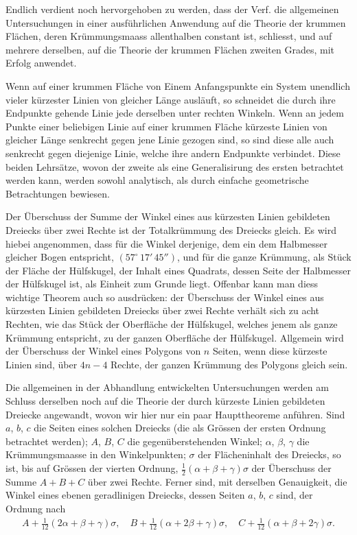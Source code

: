 \documentclass[fontsize=10pt,paper=a5,pagesize,headings=small,headinclude=true,footinclude=true]{scrbook}
\begin{document}
Endlich verdient noch hervorgehoben zu werden, dass der Verf. die allgemeinen Untersuchungen in einer ausführlichen Anwendung auf die Theorie der krummen Flächen, deren Krümmungsmaass allenthalben constant ist, schliesst, und auf mehrere derselben, auf die Theorie der krummen Flächen zweiten Grades, mit Erfolg anwendet.

Wenn auf einer krummen Fläche von Einem Anfangspunkte ein System unendlich vieler kürzester Linien von gleicher Länge ausläuft, so schneidet die durch ihre Endpunkte gehende Linie jede derselben unter rechten Winkeln. Wenn an jedem Punkte einer beliebigen Linie auf einer krummen Fläche kürzeste Linien von gleicher Länge senkrecht gegen jene Linie gezogen sind, so sind diese alle auch senkrecht gegen diejenige Linie, welche ihre andern Endpunkte verbindet. Diese beiden Lehrsätze, wovon der zweite als eine Generalisirung des ersten betrachtet werden kann, werden sowohl analytisch, als durch einfache geometrische Betrachtungen bewiesen.

Der Überschuss der Summe der Winkel eines aus kürzesten Linien gebildeten Dreiecks über zwei Rechte ist der Totalkrümmung des Dreiecks gleich. Es wird hiebei angenommen, dass für die Winkel derjenige, dem ein dem Halbmesser gleicher Bogen entspricht, $(57^\circ\,17'\,45'')$, und für die ganze Krümmung, als Stück der Fläche der Hülfskugel, der Inhalt eines Quadrats, dessen Seite der Halbmesser der Hülfskugel ist, als Einheit zum Grunde liegt. Offenbar kann man diess wichtige Theorem auch so ausdrücken: der Überschuss der Winkel eines aus kürzesten Linien gebildeten Dreiecks über zwei Rechte verhält sich zu acht Rechten, wie das Stück der Oberfläche der Hülfskugel, welches jenem als ganze Krümmung entspricht, zu der ganzen Oberfläche der Hülfskugel. Allgemein wird der Überschuss der Winkel eines Polygons von $n$ Seiten, wenn diese kürzeste Linien sind, über $4n-4$ Rechte, der ganzen Krümmung des Polygons gleich sein.

Die allgemeinen in der Abhandlung entwickelten Untersuchungen werden am Schluss derselben noch auf die Theorie der durch kürzeste Linien gebildeten Dreiecke angewandt, wovon wir hier nur ein paar Haupttheoreme anführen. Sind $a$, $b$, $c$ die Seiten eines solchen Dreiecks (die als Grössen der ersten Ordnung betrachtet werden); $A$, $B$, $C$ die gegenüberstehenden Winkel; $\alpha$, $\beta$, $\gamma$ die Krümmungsmaasse in den Winkelpunkten; $\sigma$ der Flächeninhalt des Dreiecks, so ist, bis auf Grössen der vierten Ordnung, $\tfrac{1}{2}(\alpha+\beta+\gamma)\sigma$ der Überschuss der Summe $A+B+C$ über zwei Rechte. Ferner sind, mit derselben Genauigkeit, die Winkel eines ebenen geradlinigen Dreiecks, dessen Seiten $a$, $b$, $c$ sind, der Ordnung nach
\begin{align*}
A+\tfrac{1}{12}(2\alpha+\beta+\gamma)\sigma,\quad
B+\tfrac{1}{12}(\alpha+2\beta+\gamma)\sigma,\quad
C+\tfrac{1}{12}(\alpha+\beta+2\gamma)\sigma.
\end{align*}
\end{document}
